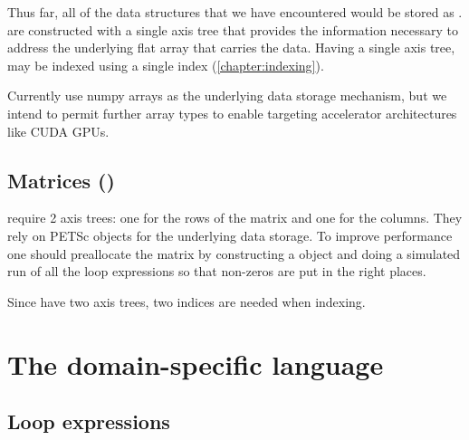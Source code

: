 \documentclass[thesis]{subfiles}
\begin{document}
Thus far, all of the data structures that we have encountered would be stored as .
 are constructed with a single axis tree that provides the information necessary to address the underlying flat array that carries the data.
Having a single axis tree,  may be indexed using a single index (\cref{chapter:indexing}).

Currently  use numpy arrays as the underlying data storage mechanism, but we intend to permit further array types to enable targeting accelerator architectures like CUDA GPUs.

\subsection{Matrices ()}

 require 2 axis trees: one for the rows of the matrix and one for the columns.
They rely on PETSc  objects for the underlying data storage.
To improve performance one should preallocate the matrix by constructing a  object and doing a simulated run of all the loop expressions so that non-zeros are put in the right places.

Since  have two axis trees, two indices are needed when indexing.

\section{The domain-specific language}
\label{sec:dsl}

\subsection{Loop expressions}

\end{document}
